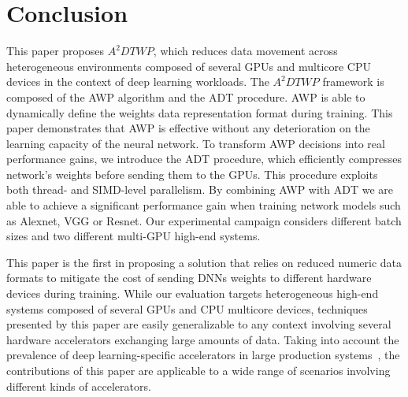 \section{Conclusion}
\label{sec:conclusion}

This paper proposes $A^2DTWP$, which reduces data movement 
across heterogeneous environments composed of several GPUs and multicore CPU devices 
in the context of deep learning workloads.
The $A^2DTWP$ framework is composed of the AWP algorithm and the ADT procedure.
AWP is able to dynamically define the weights data representation format
during training. 
This paper demonstrates that AWP is
effective without any deterioration on the learning capacity of
the neural network.
To transform AWP decisions into real performance gains, 
we introduce the ADT procedure, which efficiently compresses network's weights before sending them to the GPUs. 
This procedure exploits both thread- and SIMD-level parallelism. 
By combining AWP with ADT we are able to achieve a significant performance gain 
when training network models such as Alexnet, VGG or Resnet.
Our experimental campaign considers different batch sizes and two different multi-GPU high-end systems.

This paper is the first in proposing a solution that relies on  
reduced numeric data formats to mitigate the cost of sending DNNs weights to 
different hardware devices during training.
While our evaluation targets heterogeneous high-end systems composed of several GPUs 
and CPU multicore devices, techniques presented by this paper are easily generalizable 
to any context involving several hardware accelerators exchanging large 
amounts of data.
Taking into account the prevalence of deep learning-specific accelerators in large
production systems~\cite{Jouppi2017}, the contributions of this paper are 
applicable to a wide range of scenarios involving different kinds of accelerators.

